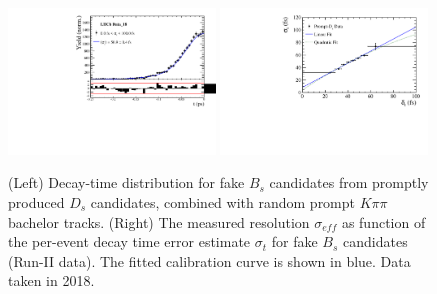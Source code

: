 \begin{figure}[h]
\centering
\includegraphics[height=!,width=0.49\textwidth]{figs/Resolution/SignalData_18_bin_all.pdf}
\includegraphics[height=!,width=0.49\textwidth]{figs/Resolution/ScaleFactor_Data_18.pdf}
\caption{ (Left) Decay-time distribution for fake $B_s$ candidates from promptly produced $D_s$ candidates, combined with random prompt $K\pi\pi$ bachelor tracks.
(Right) The measured resolution $\sigma_{eff}$ as function of the per-event decay time error estimate $\sigma_t$ for fake $B_s$ candidates (Run-II data).
The fitted calibration curve is shown in blue. Data taken in 2018.}
\label{fig:scaleFactorData_18}
\end{figure}


%
%
%




